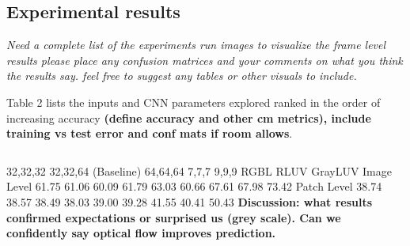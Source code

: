 \documentclass{article}
\begin{document}
\subsection{Experimental results} %
\label{sub:experimental_results}
\textit{Need a complete list of the experiments run
images to visualize the frame level results
please place any confusion matrices and your comments on what you think the results say.
feel free to suggest any tables or other visuals to include.}

Table 2 lists the inputs and CNN parameters explored ranked in the order of increasing accuracy \textbf{(define accuracy and other cm metrics), include training vs test error and conf mats if room allows}.  
\begin{tabular}{c}

\end{tabular}
            32,32,32	32,32,64 (Baseline)	64,64,64	7,7,7	9,9,9	RGBL	RLUV    GrayLUV	
Image Level	61.75	61.06	60.09	61.79	63.03	60.66	67.61	67.98	73.42
Patch Level	38.74	38.57	38.49	38.03	39.00	39.28	41.55	40.41	50.43
 \textbf{Discussion: what results confirmed expectations or surprised us (grey scale). Can we confidently say optical flow improves prediction. }
\end{document}
